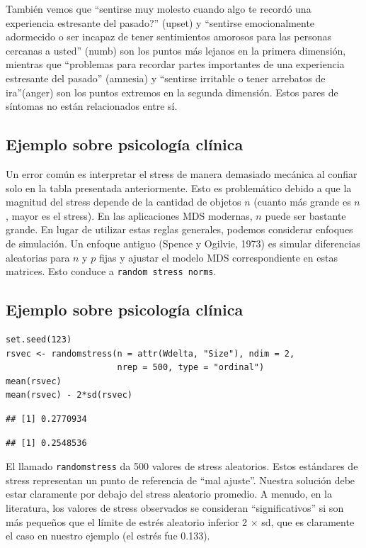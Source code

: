 \documentclass[]{article}
\begin{document}
\hypertarget{right}{}
También vemos que ``sentirse muy molesto cuando algo te recordó una
experiencia estresante del pasado?'' (upset) y ``sentirse emocionalmente
adormecido o ser incapaz de tener sentimientos amorosos para las
personas cercanas a usted'' (numb) son los puntos más lejanos en la
primera dimensión, mientras que ``problemas para recordar partes
importantes de una experiencia estresante del pasado'' (amnesia) y
``sentirse irritable o tener arrebatos de ira''(anger) son los puntos
extremos en la segunda dimensión. Estos pares de síntomas no están
relacionados entre sí.

\subsection{Ejemplo sobre psicología
clínica}\label{ejemplo-sobre-psicologuxeda-cluxednica-5}

Un error común es interpretar el stress de manera demasiado mecánica al
confiar solo en la tabla presentada anteriormente. Esto es problemático
debido a que la magnitud del stress depende de la cantidad de objetos
\(n\) (cuanto más grande es \(n\), mayor es el stress). En las
aplicaciones MDS modernas, \(n\) puede ser bastante grande. En lugar de
utilizar estas reglas generales, podemos considerar enfoques de
simulación. Un enfoque antiguo (Spence y Ogilvie, 1973) es simular
diferencias aleatorias para \(n\) y \(p\) fijas y ajustar el modelo MDS
correspondiente en estas matrices. Esto conduce a
\texttt{random\ stress\ norms}.

\subsection{Ejemplo sobre psicología
clínica}\label{ejemplo-sobre-psicologuxeda-cluxednica-6}

\hypertarget{left}{}
\begin{verbatim}
set.seed(123)
rsvec <- randomstress(n = attr(Wdelta, "Size"), ndim = 2,
                      nrep = 500, type = "ordinal")
mean(rsvec)
mean(rsvec) - 2*sd(rsvec)
\end{verbatim}

\begin{verbatim}
## [1] 0.2770934
\end{verbatim}

\begin{verbatim}
## [1] 0.2548536
\end{verbatim}

\hypertarget{right}{}
El llamado \texttt{randomstress} da 500 valores de stress aleatorios.
Estos estándares de stress representan un punto de referencia de ``mal
ajuste''. Nuestra solución debe estar claramente por debajo del stress
aleatorio promedio. A menudo, en la literatura, los valores de stress
observados se consideran ``significativos'' si son más pequeños que el
límite de estrés aleatorio inferior 2 × sd, que es claramente el caso en
nuestro ejemplo (el estrés fue 0.133).
\end{document}
